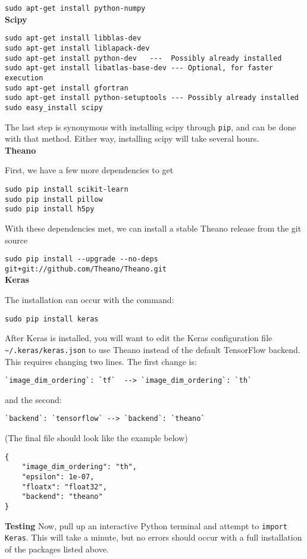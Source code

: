 \verb|sudo apt-get install python-numpy |\\

\textbf{Scipy}
\begin{lstlisting}
sudo apt-get install libblas-dev
sudo apt-get install liblapack-dev
sudo apt-get install python-dev   ---  Possibly already installed
sudo apt-get install libatlas-base-dev --- Optional, for faster execution
sudo apt-get install gfortran
sudo apt-get install python-setuptools --- Possibly already installed
sudo easy_install scipy
\end{lstlisting}

The last step is synonymous with installing scipy through \verb|pip|, and can be done with that method.
Either way, installing scipy will take several hours. \\

\textbf{Theano}

First, we have a few more dependencies to get

\begin{lstlisting}
sudo pip install scikit-learn
sudo pip install pillow
sudo pip install h5py
\end{lstlisting}
With these dependencies met, we can install a stable Theano release from the git source

\verb|sudo pip install --upgrade --no-deps git+git://github.com/Theano/Theano.git|\\

\textbf{Keras}

The installation can occur with the command:

\verb|sudo pip install keras|

After Keras is installed, you will want to edit the Keras configuration file \verb|~/.keras/keras.json| to use Theano instead of the default TensorFlow backend.
This requires changing two lines. The first change is: 

\verb|`image_dim_ordering`: `tf`  --> `image_dim_ordering`: `th`|

and the second:

\verb|`backend`: `tensorflow` --> `backend`: `theano`|

(The final file should look like the example below)

\begin{lstlisting}
{
    "image_dim_ordering": "th", 
    "epsilon": 1e-07, 
    "floatx": "float32", 
    "backend": "theano"
}
\end{lstlisting}

\textbf{Testing}
Now, pull up an interactive Python terminal and attempt to \verb|import Keras|. This will take a minute, but no errors should occur with a full installation of the packages listed above.
